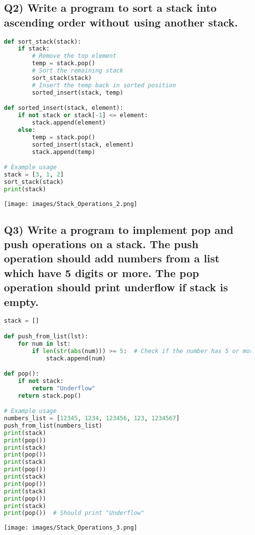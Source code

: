 \documentclass{article}
\begin{document}
\subsection*{Q2) Write a program to sort a stack into ascending order without using another stack.}
\begin{lstlisting}[language=Python]
def sort_stack(stack):
    if stack:
        # Remove the top element
        temp = stack.pop()
        # Sort the remaining stack
        sort_stack(stack)
        # Insert the temp back in sorted position
        sorted_insert(stack, temp)

def sorted_insert(stack, element):
    if not stack or stack[-1] <= element:
        stack.append(element)
    else:
        temp = stack.pop()
        sorted_insert(stack, element)
        stack.append(temp)

# Example usage
stack = [3, 1, 2]
sort_stack(stack)
print(stack)
\end{lstlisting}
\texttt{[image: images/Stack\_Operations\_2.png]}

\subsection*{Q3) Write a program to implement pop and push operations on a stack. The push operation should add numbers from a list which have 5 digits or more. The pop operation should print underflow if stack is empty.}
\begin{lstlisting}[language=Python]
stack = []

def push_from_list(lst):
    for num in lst:
        if len(str(abs(num))) >= 5:  # Check if the number has 5 or more digits
            stack.append(num)

def pop():
    if not stack:
        return "Underflow"
    return stack.pop()

# Example usage
numbers_list = [12345, 1234, 123456, 123, 1234567]
push_from_list(numbers_list)
print(stack)
print(pop())
print(stack)
print(pop())
print(stack)
print(pop())
print(stack)
print(pop())
print(stack)
print(pop())
print(stack)
print(pop())  # Should print "Underflow"
\end{lstlisting}
\texttt{[image: images/Stack\_Operations\_3.png]}
\end{document}
